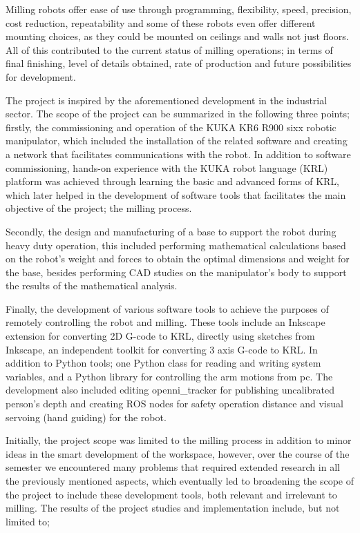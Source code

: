 \documentclass{article}
\begin{document}
	
	Milling robots offer ease of use through programming, flexibility, speed, precision, cost reduction, repeatability and some of these robots even offer different mounting choices, as they could be mounted on ceilings and walls not just floors. All of this contributed to the current status of milling operations; in terms of final finishing, level of details obtained, rate of production and future possibilities for development. 
	
	
	The project is inspired by the aforementioned development in the industrial sector. The scope of the project can be summarized in the following three points; firstly, the commissioning and operation of the KUKA KR6 R900 sixx robotic manipulator, which included the installation of the related software and creating a network that facilitates communications with the robot. In addition to software commissioning, hands-on experience with the KUKA robot language (KRL) platform was achieved through learning the basic and advanced forms of KRL, which later helped in the development of software tools that facilitates the main objective of the project; the milling process. 
	
\smallskip	
	Secondly, the design and manufacturing of a base to support the robot during heavy duty operation, this included performing mathematical calculations based on the robot’s weight and forces to obtain the optimal dimensions and weight for the base, besides performing CAD studies on the manipulator’s body to support the results of the mathematical analysis. 
	
\medskip
	
	Finally, the development of various software tools to achieve the purposes of remotely controlling the robot and milling. These tools include an Inkscape extension for converting 2D G-code to KRL, directly using sketches from Inkscape, an independent toolkit for converting 3 axis G-code to KRL. In addition to Python tools; one Python class for reading and writing system variables, and a Python library for controlling the arm motions from pc. The development also included editing openni\_tracker for publishing uncalibrated person's depth and creating ROS nodes for safety operation distance and visual servoing (hand guiding) for the robot.
	
	Initially, the project scope was limited to the milling process in addition to minor ideas in the smart development of the workspace, however, over the course of the semester we encountered many problems that required extended research in all the previously mentioned aspects, which eventually led to broadening the scope of the project to include these development tools, both relevant and irrelevant to milling. 
	The results of the project studies and implementation include, but not limited to; 
\end{document}
